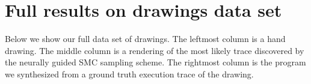 \documentclass{article}
\newcommand{\probability}{\mathds{P}} %
\begin{document}




\section{Full results on drawings data set}

Below we show our full data set of drawings. The leftmost column is a hand drawing. The middle column is a rendering of the most likely trace discovered by the neurally guided SMC sampling scheme. The rightmost column is the program we synthesized from a ground truth execution trace of the drawing.


 



{\small }
 
\end{document}
